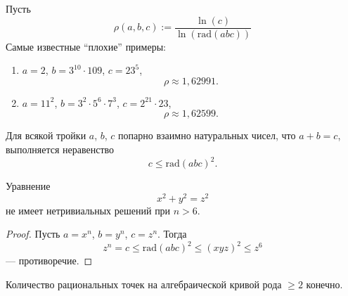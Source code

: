 \documentclass[12pt,a4paper]{article}
\newcommand{\rad}{\mathrm{rad}}
\begin{document}
    \begin{example}
        Пусть
        \[\rho(a, b, c) := \frac{\ln(c)}{\ln(\rad(abc))}\]
        Самые известные ``плохие'' примеры:
        \begin{enumerate}
            \item $a = 2$, $b = 3^{10} \cdot 109$, $c = 23^5$,
                \[\rho \approx 1{,}62991.\]
            \item $a = 11^2$, $b = 3^2 \cdot 5^6 \cdot 7^3$, $c = 2^{21} \cdot 23$,
                \[\rho \approx 1{,}62599.\]
        \end{enumerate}
    \end{example}
    
    \begin{statement}[открыта]
        Для всякой тройки $a$, $b$, $c$ попарно взаимно натуральных чисел, что $a + b = c$, выполняется неравенство
        \[c \leqslant \rad(abc)^2.\]
    \end{statement}
    
    \begin{corollary}
        Уравнение
        \[x^2 + y^2 = z^2\]
        не имеет нетривиальных решений при $n > 6$.
    \end{corollary}

    \begin{proof}
        Пусть $a = x^n$, $b = y^n$, $c = z^n$. Тогда
        \[z^n = c \leqslant \rad(abc)^2 \leqslant (xyz)^2 \leqslant z^6\]
        --- противоречие.
    \end{proof}
    
    \begin{statement}
        Количество рациональных точек на алгебраической кривой рода $\geqslant 2$ конечно.
    \end{statement}
\end{document}
